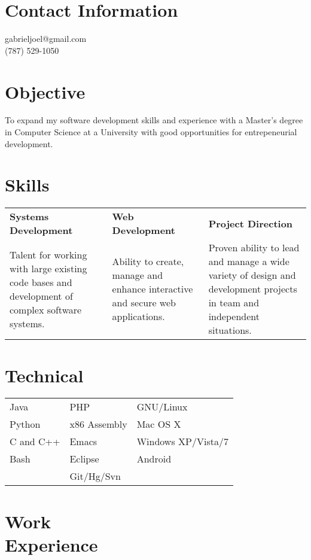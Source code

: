 \documentclass[margin,line]{res}
\begin{document}


\begin{resume}
\section{\sc Contact Information}
\vspace{.05in}
gabrieljoel@gmail.com \\
(787) 529-1050       



\section{\sc Objective}
To expand my software development skills and experience with a Master's degree in Computer Science at a University with good opportunities for entrepeneurial development.  
\section{\sc Skills}
\begin{tabular}{@{}p{2in}p{2in}p{1.7in}}
{\bf Systems Development}             & {\bf Web Development}  & {\bf Project Direction} \\            
Talent for working with large existing code bases and development of complex software systems. & Ability to create, manage and enhance interactive and secure web applications. & Proven ability to lead and manage a wide variety of design and development projects in team and independent situations.   
\end{tabular}

\section{\sc Technical}
\begin{tabular}{@{}p{2in}p{2in}p{2in}}
 Java           & PHP  & GNU/Linux  \\            
Python   & x86 Assembly & Mac OS X   \\
C and C++ & Emacs & Windows XP/Vista/7 \\
Bash & Eclipse & Android \\
& Git/Hg/Svn  & 
\end{tabular}



\section{\sc Work \\Experience}


\end{resume}
\end{document}
